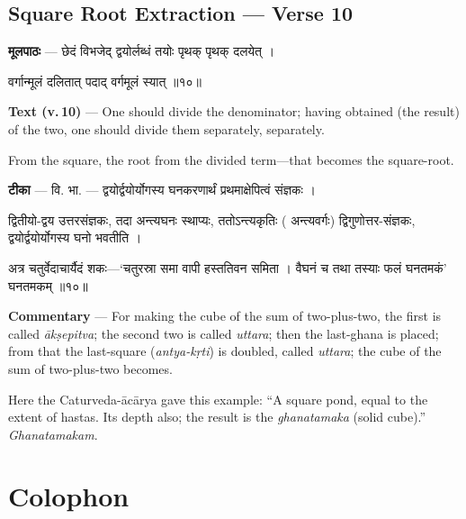 \documentclass[11pt,a4paper]{article}
\newcommand{\skt}[1]{{\devanagarifont\color{sktcolor} #1}}
\newenvironment{bilingual}{%
  \par\noindent
  \begin{minipage}[t]{0.47\textwidth}%
}{%
  \par\end{minipage}%
}
\newcommand{\rightcol}{%
  \par\end{minipage}%
  \hfill
  \begin{minipage}[t]{0.47\textwidth}%
}
\begin{document}
\subsection*{Square Root Extraction --- Verse 10}

\begin{bilingual}
\textbf{मूलपाठः} --- \skt{छेदं विभजेद् द्वयोर्लब्धं तयोः पृथक् पृथक् दलयेत्} ।

\skt{वर्गान्मूलं दलितात् पदाद् वर्गमूलं स्यात्} ॥१०॥
\rightcol
\textbf{Text (v.\,10)} --- One should divide the denominator; having obtained (the result) of the two, one should divide them separately, separately.

From the square, the root from the divided term---that becomes the square-root.
\end{bilingual}

\medskip

\begin{bilingual}
\textbf{टीका} --- \skt{वि. भा. --- द्वयोर्द्वयोर्योगस्य घनकरणार्थं प्रथमाक्षेपित्वं संज्ञकः} ।

\skt{द्वितीयो-द्वय उत्तरसंज्ञकः, तदा अन्त्यघनः स्थाप्यः, ततोऽन्त्यकृतिः} (\skt{अन्त्यवर्गः}) \skt{द्विगुणोत्तर-संज्ञकः, द्वयोर्द्वयोर्योगस्य घनो भवतीति} ।

\skt{अत्र चतुर्वेदाचार्यैदं शकः---`चतुरस्रा समा वापी हस्ततिवन समिता । वैघनं च तथा तस्याः फलं घनतमकं' घनतमकम्} ॥१०॥
\rightcol
\textbf{Commentary} --- For making the cube of the sum of two-plus-two, the first is called \textit{ākṣepitva}; the second two is called \textit{uttara}; then the last-ghana is placed; from that the last-square (\textit{antya-kṛti}) is doubled, called \textit{uttara}; the cube of the sum of two-plus-two becomes.

Here the Caturveda-ācārya gave this example: ``A square pond, equal to the extent of hastas. Its depth also; the result is the \textit{ghanatamaka} (solid cube).'' \textit{Ghanatamakam}.
\end{bilingual}


\newpage
\section*{Colophon}
\end{document}
